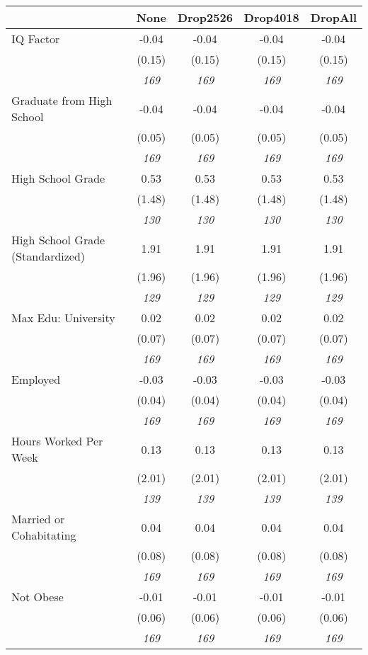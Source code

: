 \begin{tabular}{l c c c c}
\toprule
 & None & Drop2526 & Drop4018 & DropAll \\
\midrule
IQ Factor & -0.04 & -0.04 & -0.04 & -0.04 \\
& (0.15) & (0.15) & (0.15) & (0.15) \\
& \textit{ 169 } & \textit{ 169 } & \textit{ 169 } & \textit{ 169 } \\
Graduate from High School & -0.04 & -0.04 & -0.04 & -0.04 \\
& (0.05) & (0.05) & (0.05) & (0.05) \\
& \textit{ 169 } & \textit{ 169 } & \textit{ 169 } & \textit{ 169 } \\
High School Grade & 0.53 & 0.53 & 0.53 & 0.53 \\
& (1.48) & (1.48) & (1.48) & (1.48) \\
& \textit{ 130 } & \textit{ 130 } & \textit{ 130 } & \textit{ 130 } \\
High School Grade (Standardized) & 1.91 & 1.91 & 1.91 & 1.91 \\
& (1.96) & (1.96) & (1.96) & (1.96) \\
& \textit{ 129 } & \textit{ 129 } & \textit{ 129 } & \textit{ 129 } \\
Max Edu: University & 0.02 & 0.02 & 0.02 & 0.02 \\
& (0.07) & (0.07) & (0.07) & (0.07) \\
& \textit{ 169 } & \textit{ 169 } & \textit{ 169 } & \textit{ 169 } \\
Employed & -0.03 & -0.03 & -0.03 & -0.03 \\
& (0.04) & (0.04) & (0.04) & (0.04) \\
& \textit{ 169 } & \textit{ 169 } & \textit{ 169 } & \textit{ 169 } \\
Hours Worked Per Week & 0.13 & 0.13 & 0.13 & 0.13 \\
& (2.01) & (2.01) & (2.01) & (2.01) \\
& \textit{ 139 } & \textit{ 139 } & \textit{ 139 } & \textit{ 139 } \\
Married or Cohabitating & 0.04 & 0.04 & 0.04 & 0.04 \\
& (0.08) & (0.08) & (0.08) & (0.08) \\
& \textit{ 169 } & \textit{ 169 } & \textit{ 169 } & \textit{ 169 } \\
Not Obese & -0.01 & -0.01 & -0.01 & -0.01 \\
& (0.06) & (0.06) & (0.06) & (0.06) \\
& \textit{ 169 } & \textit{ 169 } & \textit{ 169 } & \textit{ 169 } \\

\end{tabular}
